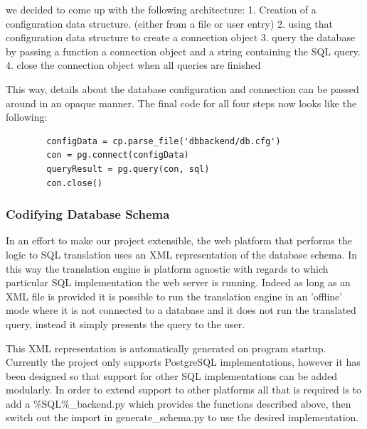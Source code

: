 \documentclass[a4paper, 11pt]{article}
\begin{document}
      we decided to come up with the following architecture: 
      1. Creation of a configuration data structure. (either from a file or user
         entry)
      2. using that configuration data structure to create a connection object
      3. query the database by passing a function a connection object and a
      string containing the SQL query.
      4. close the connection object when all queries are finished

      This way, details about the database configuration and connection 
      can be passed around in an opaque manner. The final code for all four
      steps now looks like the following: 

      \begin{verbatim}
        configData = cp.parse_file('dbbackend/db.cfg')
        con = pg.connect(configData)
        queryResult = pg.query(con, sql)
        con.close()
      \end{verbatim}

      \subsubsection{Codifying Database Schema}
      In an effort to make our project extensible, the web platform that performs 
      the logic to SQL translation uses an XML representation of the database
      schema. In this way the translation engine is platform agnostic with
      regards to which particular SQL implementation the web server is running.
      Indeed as long as an XML file is provided it is possible to run the
      translation engine in an 'offline' mode where it is not connected to a
      database and it does not run the translated query, instead it simply
      presents the query to the user.

      This XML representation is automatically generated on program startup. 
      Currently the project only supports PostgreSQL implementations, however it 
      has been designed so that support for other SQL implementations can be 
      added modularly. In order to extend support to other platforms all that is  
      required is to add a \%SQL\%\_backend.py which provides the functions
      described above, then switch out the import in generate\_schema.py to use
      the desired implementation.

\end{document}
